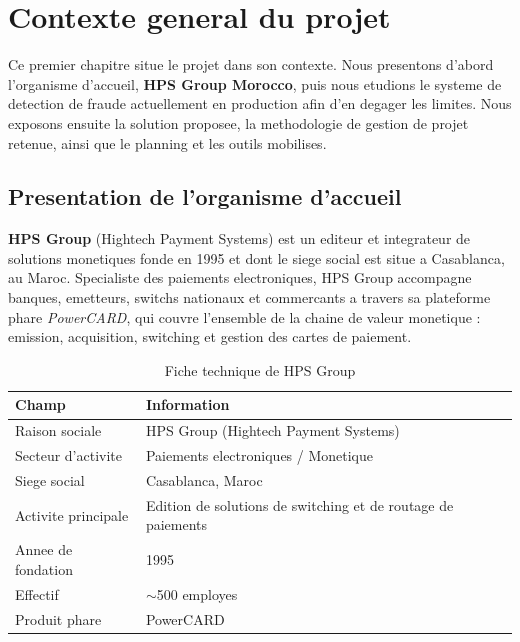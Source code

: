 \chapter{Contexte general du projet}
\label{chap:contexte}

\introchapitre

Ce premier chapitre situe le projet dans son contexte. Nous presentons d'abord
l'organisme d'accueil, \textbf{HPS Group Morocco}, puis nous etudions le systeme de
detection de fraude actuellement en production afin d'en degager les limites. Nous
exposons ensuite la solution proposee, la methodologie de gestion de projet retenue,
ainsi que le planning et les outils mobilises.

\section{Presentation de l'organisme d'accueil}
\label{sec:organisme}

\textbf{HPS Group} (Hightech Payment Systems) est un editeur et integrateur de
solutions monetiques fonde en 1995 et dont le siege social est situe a Casablanca,
au Maroc. Specialiste des paiements electroniques, HPS Group accompagne banques,
emetteurs, switchs nationaux et commercants a travers sa plateforme phare
\textit{PowerCARD}, qui couvre l'ensemble de la chaine de valeur monetique :
emission, acquisition, switching et gestion des cartes de paiement.

\begin{table}[H]
\centering
\renewcommand{\arraystretch}{1.4}
\begin{tabular}{|l|l|}
\hline
\textbf{Champ} & \textbf{Information} \\
\hline
Raison sociale & HPS Group (Hightech Payment Systems) \\
\hline
Secteur d'activite & Paiements electroniques / Monetique \\
\hline
Siege social & Casablanca, Maroc \\
\hline
Activite principale & Edition de solutions de switching et de routage de paiements \\
\hline
Annee de fondation & 1995 \\
\hline
Effectif & $\sim$500 employes \\
\hline
Produit phare & PowerCARD \\
\hline
\end{tabular}
\caption{Fiche technique de HPS Group}
\label{tab:fiche-hps}
\end{table}

